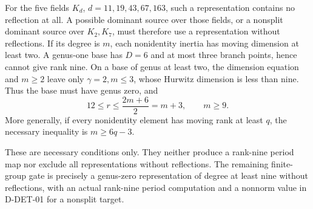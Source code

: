 For the five fields \(K_d\), \(d=11,19,43,67,163\), such a
representation contains no reflection at all. A possible dominant
source over those fields, or a nonsplit dominant source over \(K_2,K_7\),
must therefore use a representation without reflections. If its degree
is \(m\), each nonidentity inertia has moving dimension at least two.
A genus-one base has \(D=6\) and at most three branch points, hence
cannot give rank nine. On a base of genus at least two, the dimension
equation and \(m\ge2\) leave only \(\gamma=2,m\le3\), whose
Hurwitz dimension is less than nine. Thus the base must have genus zero,
and
\[
                 12\le r\le\frac{2m+6}{2}=m+3,
                 \qquad m\ge9.
\]
More generally, if every nonidentity element has moving rank at least
\(q\), the necessary inequality is \(m\ge6q-3\).

These are necessary conditions only. They neither produce a rank-nine
period map nor exclude all representations without reflections. The
remaining finite-group gate is precisely a genus-zero representation
of degree at least nine without reflections, with an actual rank-nine
period computation and a nonnorm value in D-DET-01 for a nonsplit target.
